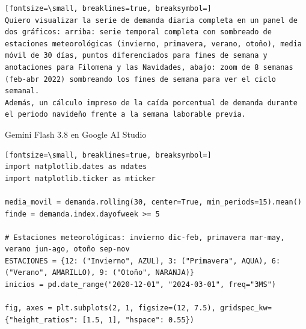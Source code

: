\documentclass[12pt,a4paper,oneside]{book}
\begin{document}
\begin{iaprompt}
\begin{Verbatim}[fontsize=\small, breaklines=true, breaksymbol=]
Quiero visualizar la serie de demanda diaria completa en un panel de dos gráficos: arriba: serie temporal completa con sombreado de estaciones meteorológicas (invierno, primavera, verano, otoño), media móvil de 30 días, puntos diferenciados para fines de semana y anotaciones para Filomena y las Navidades, abajo: zoom de 8 semanas (feb-abr 2022) sombreando los fines de semana para ver el ciclo semanal.
Además, un cálculo impreso de la caída porcentual de demanda durante el periodo navideño frente a la semana laborable previa.
\end{Verbatim}
\end{iaprompt}
\begin{iaresp}{Gemini Flash 3.8 en Google AI Studio}
\begin{Verbatim}[fontsize=\small, breaklines=true, breaksymbol=]
import matplotlib.dates as mdates
import matplotlib.ticker as mticker

media_movil = demanda.rolling(30, center=True, min_periods=15).mean()
finde = demanda.index.dayofweek >= 5

# Estaciones meteorológicas: invierno dic-feb, primavera mar-may, verano jun-ago, otoño sep-nov
ESTACIONES = {12: ("Invierno", AZUL), 3: ("Primavera", AQUA), 6: ("Verano", AMARILLO), 9: ("Otoño", NARANJA)}
inicios = pd.date_range("2020-12-01", "2024-03-01", freq="3MS")

fig, axes = plt.subplots(2, 1, figsize=(12, 7.5), gridspec_kw={"height_ratios": [1.5, 1], "hspace": 0.55})


\end{Verbatim}
\end{iaresp}
\end{document}
